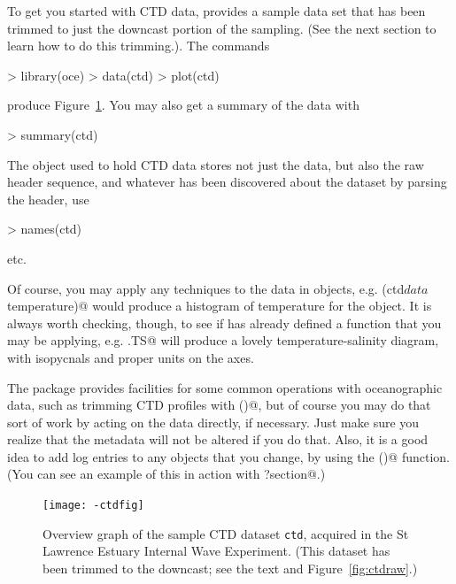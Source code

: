 \documentclass{article}
\begin{document}
To get you started with CTD data, \verb@oce@ provides a sample data set that has
been trimmed to just the downcast portion of the sampling.  (See the next
section to learn how to do this trimming.).  The commands
\begin{Schunk}
\begin{Sinput}
> library(oce)
> data(ctd)
> plot(ctd)
\end{Sinput}
\end{Schunk}
produce Figure~\ref{fig:ctd}. You may also get a summary of the data with
\begin{Schunk}
\begin{Sinput}
> summary(ctd)
\end{Sinput}
\end{Schunk}

The object used to hold CTD data stores not just the data, but also the raw
header sequence, and whatever has been discovered about the dataset by parsing
the header, use
\begin{Schunk}
\begin{Sinput}
> names(ctd)
\end{Sinput}
\end{Schunk}
etc.

Of course, you may apply any \verb@R@ techniques to the data in \verb@oce@
objects, e.g. \verb@hist(ctd$data$temperature)@ would produce a histogram of
temperature for the \verb@ctd@ object.  It is always worth checking, though, to
see if \verb@oce@ has already defined a function that you may be applying,
e.g. \verb@plot.TS@ will produce a lovely temperature-salinity diagram, with
isopycnals and proper units on the axes.

The package provides facilities for some common operations with oceanographic
data, such as trimming CTD profiles with \verb@ctdTrim()@, but of course you
may do that sort of work by acting on the data directly, if necessary.  Just
make sure you realize that the metadata will not be altered if you do that.
Also, it is a good idea to add log entries to any objects that you change, by
using the \verb@historyAdd()@ function.  (You can see an example of
this in action with \verb@?section@.)

\begin{figure}
\begin{center}
\texttt{[image: -ctdfig]}
\end{center}
\caption{Overview graph of the sample CTD dataset \texttt{ctd}, acquired in
the St Lawrence Estuary Internal Wave Experiment.  (This dataset has been
trimmed to the downcast; see the text and Figure~\ref{fig:ctdraw}.)}
\label{fig:ctd}
\end{figure}
\end{document}
